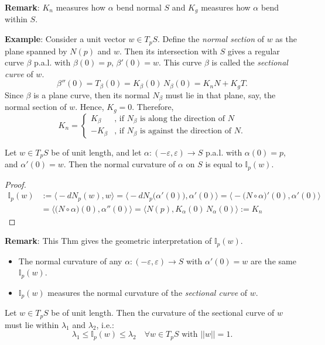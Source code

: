 \noindent\textbf{Remark}: $K_n$ measures how $\alpha$ bend normal $S$ and $K_g$ measures how $\alpha$ bend within $S$.

\noindent\textbf{Example}: Consider a unit vector $w\in T_pS$. Define the \textit{normal section} of $w$ as the plane spanned by $N(p)$ and $w$. Then its intersection with $S$ gives a regular curve $\beta$ p.a.l. with $\beta(0) = p$, $\beta'(0) = w$. This curve $\beta$ is called the \textit{sectional curve} of $w$.
\[
\beta''(0) = T_\beta(0) = K_\beta(0)\,N_\beta(0) = K_nN + K_gT.
\]
Since $\beta$ is a plane curve, then its normal $N_\beta$ must lie in that plane, say, the normal section of $w$. Hence, $K_g = 0$. Therefore,
\[
K_n = \begin{cases}
K_\beta & \text{, if } N_\beta\text{ is along the direction of } N\\[1mm]
-K_\beta & \text{, if } N_\beta\text{ is against the direction of } N.
\end{cases}
\]

\begin{theorem}
Let $w\in T_pS$ be of unit length, and let $\alpha: (-\varepsilon, \varepsilon)\to S$ p.a.l. with $\alpha(0) = p$, and $\alpha'(0) = w$. Then the normal curvature of $\alpha$ on $S$ is equal to $\mathbb{I}_p(w)$.
\end{theorem}

\begin{proof}
\begin{align*}
    \mathbb{I}_p(w) &:= \big\langle -dN_p(w), w\big\rangle = \big\langle -dN_p\big(\alpha'(0)\big), \alpha'(0)\big\rangle = \Big\langle -\big(N\circ\alpha\big)'(0), \alpha'(0)\Big\rangle\\
    &= \Big\langle\big(N\circ\alpha\big)(0), \alpha''(0)\Big\rangle = \Big\langle N(p), K_\alpha(0)\,N_\alpha(0)\Big\rangle := K_n
\end{align*}
\end{proof}

\noindent\textbf{Remark}: This Thm gives the geometric interpretation of $\mathbb{I}_p(w)$.
\begin{itemize}
\item The normal curvature of any $\alpha: (-\varepsilon, \varepsilon)\to S$ with $\alpha'(0) = w$ are the same $\mathbb{I}_p(w)$.
\item $\mathbb{I}_p(w)$ measures the normal curvature of the \textit{sectional curve} of $w$.
\end{itemize}

\begin{corollary}
Let $w\in T_pS$ be of unit length. Then the curvature of the sectional curve of $w$ must lie within $\lambda_1$ and $\lambda_2$, i.e.:
\[
\lambda_1\le\mathbb{I}_p(w)\le\lambda_2 \quad \forall w\in T_pS \text{ with } ||w|| = 1.
\]
\end{corollary}

